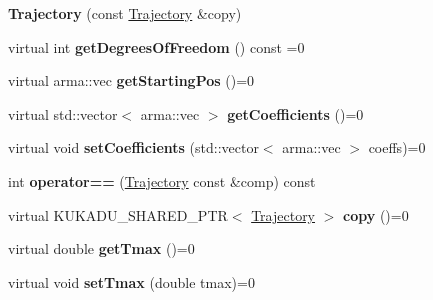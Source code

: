 \begin{DoxyCompactItemize}
\item 
{\bfseries Trajectory} (const \hyperlink{classkukadu_1_1Trajectory}{Trajectory} \&copy)\hypertarget{classkukadu_1_1Trajectory_a9546cb13ba9d3e4731af50033c54caf7}{}\label{classkukadu_1_1Trajectory_a9546cb13ba9d3e4731af50033c54caf7}

\item 
virtual int {\bfseries get\+Degrees\+Of\+Freedom} () const =0\hypertarget{classkukadu_1_1Trajectory_ac3bfd744d4afb90f67afd7c0208192fb}{}\label{classkukadu_1_1Trajectory_ac3bfd744d4afb90f67afd7c0208192fb}

\item 
virtual arma\+::vec {\bfseries get\+Starting\+Pos} ()=0\hypertarget{classkukadu_1_1Trajectory_a28ee5ea908f0f5b236a986dc0d97e8eb}{}\label{classkukadu_1_1Trajectory_a28ee5ea908f0f5b236a986dc0d97e8eb}

\item 
virtual std\+::vector$<$ arma\+::vec $>$ {\bfseries get\+Coefficients} ()=0\hypertarget{classkukadu_1_1Trajectory_a352b19fcc831bc578170b21e33e131af}{}\label{classkukadu_1_1Trajectory_a352b19fcc831bc578170b21e33e131af}

\item 
virtual void {\bfseries set\+Coefficients} (std\+::vector$<$ arma\+::vec $>$ coeffs)=0\hypertarget{classkukadu_1_1Trajectory_a4cf44e29c98bca578f901720fc4931ff}{}\label{classkukadu_1_1Trajectory_a4cf44e29c98bca578f901720fc4931ff}

\item 
int {\bfseries operator==} (\hyperlink{classkukadu_1_1Trajectory}{Trajectory} const \&comp) const \hypertarget{classkukadu_1_1Trajectory_a19baa2586084c301987a940a3d8bbf10}{}\label{classkukadu_1_1Trajectory_a19baa2586084c301987a940a3d8bbf10}

\item 
virtual K\+U\+K\+A\+D\+U\+\_\+\+S\+H\+A\+R\+E\+D\+\_\+\+P\+TR$<$ \hyperlink{classkukadu_1_1Trajectory}{Trajectory} $>$ {\bfseries copy} ()=0\hypertarget{classkukadu_1_1Trajectory_ac90ea1213d1888c4f7d7f9b41e9eb386}{}\label{classkukadu_1_1Trajectory_ac90ea1213d1888c4f7d7f9b41e9eb386}

\item 
virtual double {\bfseries get\+Tmax} ()=0\hypertarget{classkukadu_1_1Trajectory_a6204d020bea77db78f1ea15bdd6c00e3}{}\label{classkukadu_1_1Trajectory_a6204d020bea77db78f1ea15bdd6c00e3}

\item 
virtual void {\bfseries set\+Tmax} (double tmax)=0\hypertarget{classkukadu_1_1Trajectory_a88078ae380944edb6256976a9b7c31e3}{}\label{classkukadu_1_1Trajectory_a88078ae380944edb6256976a9b7c31e3}

\end{DoxyCompactItemize}


